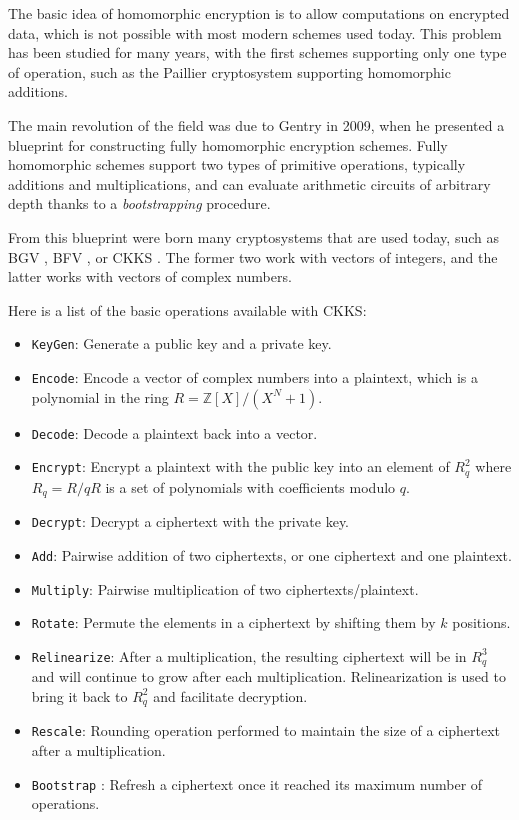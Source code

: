 \documentclass[a4paper,11pt,oneside]{report}
\begin{document}
The basic idea of homomorphic encryption is to allow computations on encrypted data, which is not possible with most modern schemes used today. This problem has been studied for many years, with the first schemes supporting only one type of operation, such as the Paillier \cite{stern_public-key_1999} cryptosystem supporting homomorphic additions. 

The main revolution of the field was due to Gentry \cite{gentry_fully_2009} in 2009, when he presented a blueprint for constructing fully homomorphic encryption schemes. Fully homomorphic schemes support two types of primitive operations, typically additions and multiplications, and can evaluate arithmetic circuits of arbitrary depth thanks to a \emph{bootstrapping} procedure.

From this blueprint were born many cryptosystems that are used today, such as BGV \cite{brakerski_leveled_2012}, BFV \cite{fan_somewhat_2012}, or CKKS \cite{cheon_homomorphic_2016, cheon_full_2018}. The former two work with vectors of integers, and the latter works with vectors of complex numbers.

Here is a list of the basic operations available with CKKS:
\begin{itemize}
    \item \texttt{KeyGen}: Generate a public key and a private key.
    \item \texttt{Encode}: Encode a vector of complex numbers into a plaintext, which is a polynomial in the ring $R = \mathbb{Z}[X]/(X^N + 1)$.
    \item \texttt{Decode}: Decode a plaintext back into a vector.
    \item \texttt{Encrypt}: Encrypt a plaintext with the public key into an element of $R_q^2$ where $R_q = R/qR$ is a set of polynomials with coefficients modulo $q$.
    \item \texttt{Decrypt}: Decrypt a ciphertext with the private key.
    \item \texttt{Add}: Pairwise addition of two ciphertexts, or one ciphertext and one plaintext.
    \item \texttt{Multiply}: Pairwise multiplication of two ciphertexts/plaintext.
    \item \texttt{Rotate}: Permute the elements in a ciphertext by shifting them by $k$ positions.
    \item \texttt{Relinearize}: After a multiplication, the resulting ciphertext will be in $R_q^3$ and will continue to grow after each multiplication. Relinearization is used to bring it back to $R_q^2$ and facilitate decryption.
    \item \texttt{Rescale}: Rounding operation performed to maintain the size of a ciphertext after a multiplication.
    \item \texttt{Bootstrap} \cite{nielsen_bootstrapping_2018}: Refresh a ciphertext once it reached its maximum number of operations.
\end{itemize}
\end{document}
